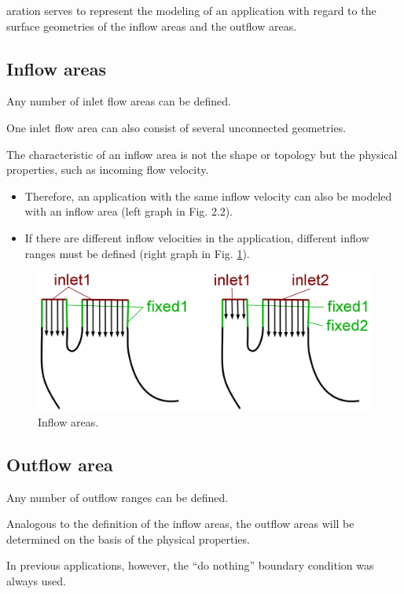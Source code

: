 \documentclass[a4paper,oneside]{book}
\numberwithin{equation}{section}
\begin{document}
aration serves to represent the modeling of an application with regard to the surface geometries of the inflow areas and the outflow areas.

\subsection{Inflow areas}
Any number of inlet flow areas can be defined.

One inlet flow area can also consist of several unconnected geometries.

The characteristic of an inflow area is not the shape or topology but the physical properties, such as incoming flow velocity.
\begin{itemize}
    \item Therefore, an application with the same inflow velocity can also be modeled with an inflow area (left graph in Fig. 2.2).
    \item If there are different inflow velocities in the application, different inflow ranges must be defined (right graph in Fig. \ref{fig:multiInlet}).
\end{itemize}

\begin{figure}[htbp]
    \centering
    \includegraphics[scale=0.7]{inletMULT.png}   
    \caption{Inflow areas.}
    \label{fig:multiInlet}
\end{figure}

\subsection{Outflow area}
Any number of outflow ranges can be defined.

Analogous to the definition of the inflow areas, the outflow areas will be determined on the basis of the physical properties.

In previous applications, however, the ``do nothing'' boundary condition was always used.
\end{document}
